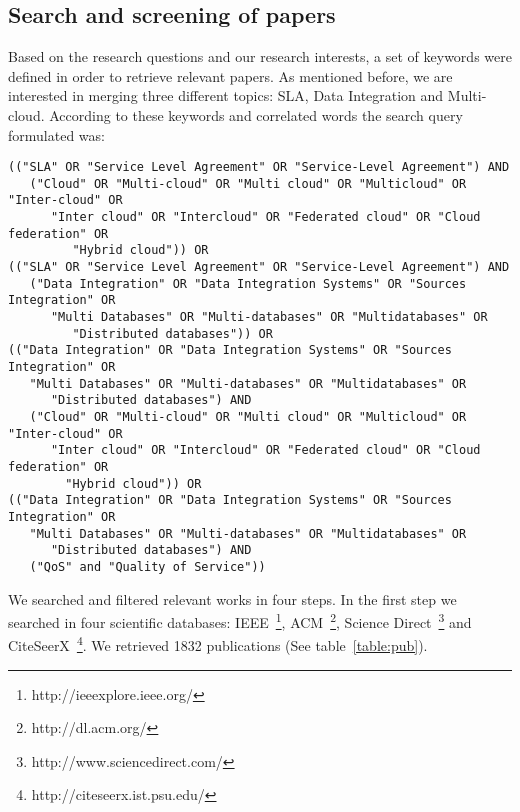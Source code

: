 \subsection{Search and screening of papers} \label{subsec:search}

Based on the research questions and our research interests, a set of keywords were defined in order to 
retrieve relevant papers.
As mentioned before, we are interested in merging three different topics: SLA, Data Integration and Multi-cloud.
According to these keywords and correlated words the search query formulated was:

\begin{verbatim}
(("SLA" OR "Service Level Agreement" OR "Service-Level Agreement") AND 
   ("Cloud" OR "Multi-cloud" OR "Multi cloud" OR "Multicloud" OR "Inter-cloud" OR 
      "Inter cloud" OR "Intercloud" OR "Federated cloud" OR "Cloud federation" OR 
         "Hybrid cloud")) OR
(("SLA" OR "Service Level Agreement" OR "Service-Level Agreement") AND 
   ("Data Integration" OR "Data Integration Systems" OR "Sources Integration" OR 
      "Multi Databases" OR "Multi-databases" OR "Multidatabases" OR 
         "Distributed databases")) OR
(("Data Integration" OR "Data Integration Systems" OR "Sources Integration" OR 
   "Multi Databases" OR "Multi-databases" OR "Multidatabases" OR 
      "Distributed databases") AND 
   ("Cloud" OR "Multi-cloud" OR "Multi cloud" OR "Multicloud" OR "Inter-cloud" OR 
      "Inter cloud" OR "Intercloud" OR "Federated cloud" OR "Cloud federation" OR 
        "Hybrid cloud")) OR
(("Data Integration" OR "Data Integration Systems" OR "Sources Integration" OR 
   "Multi Databases" OR "Multi-databases" OR "Multidatabases" OR 
      "Distributed databases") AND 
   ("QoS" and "Quality of Service"))
\end{verbatim}

We searched and filtered relevant works in four steps.
In the first step we searched in four scientific databases: IEEE~\footnote{http://ieeexplore.ieee.org/},
ACM~\footnote{http://dl.acm.org/}, Science Direct~\footnote{http://www.sciencedirect.com/} and
CiteSeerX~\footnote{http://citeseerx.ist.psu.edu/}.
We retrieved 1832 publications (See table~\ref{table:pub}).

